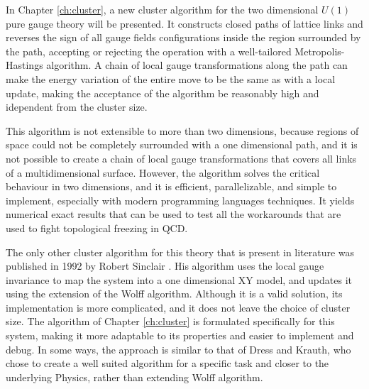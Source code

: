 In Chapter \ref{ch:cluster}, a new cluster algorithm for the two dimensional $U(1)$ pure gauge theory will be presented.
It constructs closed paths of lattice links and reverses the sign of all gauge fields configurations inside the region surrounded by the path,
accepting or rejecting the operation with a well-tailored Metropolis-Hastings algorithm.
A chain of local gauge transformations along the path can make the energy variation of the entire move to be the same as with a local update,
making the acceptance of the algorithm be reasonably high and idependent from the cluster size.

This algorithm is not extensible to more than two dimensions,
because regions of space could not be completely surrounded with a one dimensional path,
and it is not possible to create a chain of local gauge transformations that covers all links of a multidimensional surface.
However, the algorithm solves the critical behaviour in two dimensions,
and it is efficient, parallelizable, and simple to implement, especially with modern programming languages techniques.
It yields numerical exact results that can be used to test all the workarounds that are used to fight topological freezing in QCD. 

The only other cluster algorithm for this theory that is present in literature was published in 1992 by Robert Sinclair \cite{sinclair:1992}.
His algorithm uses the local gauge invariance to map the system into a one dimensional XY model, and updates it using the extension of the Wolff algorithm.
Although it is a valid solution, its implementation is more complicated, and it does not leave the choice of cluster size. 
The algorithm of Chapter \ref{ch:cluster} is formulated specifically for this system, making it more adaptable to its properties and easier to implement and debug.
In some ways, the approach is similar to that of Dress and Krauth,
who chose to create a well suited algorithm for a specific task and closer to the underlying Physics, rather than extending Wolff algorithm.\bigskip\bigskip

